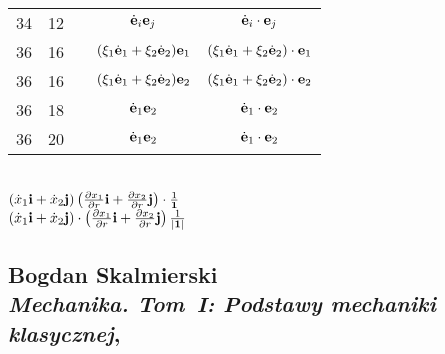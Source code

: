 \documentclass[a4paper,11pt]{article}
\numberwithin{equation}{section}
\begin{document}
\begin{center}
\begin{tabular}{|c|c|c|c|c|}
    34  & 12 & & $\dot{ \mathbf{e} }_{ i } \mathbf{e}_{ j }$
           & $\dot{ \mathbf{e} }_{ i } \cdot \mathbf{e}_{ j }$ \\
    36  & 16 & & $( \xi_{ 1 } \dot{ \mathbf{e} }_{ 1 }
                 + \xi_{ 2 } \dot{ \mathbf{e} }_{ 2 }  ) \mathbf{e}_{ 1 }$
           & $( \xi_{ 1 } \dot{ \mathbf{e} }_{ 1 }
             + \xi_{ 2 } \dot{ \mathbf{e} }_{ 2 }  ) \cdot \mathbf{e}_{ 1 }$ \\
    36  & 16 & & $( \xi_{ 1 } \dot{ \mathbf{e} }_{ 1 }
                 + \xi_{ 2 } \dot{ \mathbf{e} }_{ 2 }  ) \mathbf{e}_{ 2 }$
           & $( \xi_{ 1 } \dot{ \mathbf{e} }_{ 1 }
             + \xi_{ 2 } \dot{ \mathbf{e} }_{ 2 }  ) \cdot \mathbf{e}_{ 2 }$ \\
    36  & 18 & & $\dot{ \mathbf{e} }_{ 1 } \mathbf{e}_{ 2 }$
           & $\dot{ \mathbf{e} }_{ 1 } \cdot \mathbf{e}_{ 2 }$ \\
    36  & 20 & & $\dot{ \mathbf{e} }_{ 1 } \mathbf{e}_{ 2 }$
           & $\dot{ \mathbf{e} }_{ 1 } \cdot \mathbf{e}_{ 2 }$ \\
    \hline
  \end{tabular}

\end{center}

\VerSpaceTwo


\noindent
{} \\[0.3em]
\Jest
$( \dot{ x }_{ 1 } \mathbf{i} + \dot{ x }_{ 2 } \mathbf{j} )
\left( \frac{ \partial x_{ 1 } }{ \partial r } \mathbf{i}
  + \frac{ \partial x_{ 2 } }{ \partial r } \mathbf{j} \right)
\cdot \frac{ 1 }{ \mathbf{1} }$ \\[0.5em]
\PowinnoByc
$( \dot{ x }_{ 1 } \mathbf{i} + \dot{ x }_{ 2 } \mathbf{j} )
\cdot \left( \frac{ \partial x_{ 1 } }{ \partial r } \mathbf{i}
  + \frac{ \partial x_{ 2 } }{ \partial r } \mathbf{j} \right)
\frac{ 1 }{ | \mathbf{1} | }$ \\













\newpage

\subsection{ %
  Bogdan Skalmierski \\
  \textit{Mechanika. Tom~I: Podstawy mechaniki klasycznej},
  \cite{SkalmierskiMechanikPodstawyETCVolI1998}}
\end{document}
